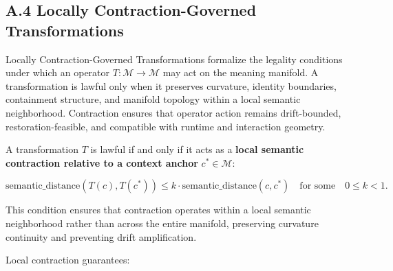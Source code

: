 
\subsection*{A.4 Locally Contraction-Governed Transformations}

\noindent Locally Contraction-Governed Transformations formalize the legality
conditions under which an operator $T : \mathcal{M} \rightarrow \mathcal{M}$
may act on the meaning manifold. A transformation is lawful only when it
preserves curvature, identity boundaries, containment structure, and manifold
topology within a local semantic neighborhood. Contraction ensures that operator
action remains drift-bounded, restoration-feasible, and compatible with runtime
and interaction geometry.

\medskip

\noindent A transformation $T$ is lawful if and only if it acts as a
\textbf{local semantic contraction relative to a context anchor} $c^* \in
\mathcal{M}$:



\[
\text{semantic\_distance}(T(c), T(c^*)) \le
k \cdot \text{semantic\_distance}(c, c^*)
\quad \text{for some} \quad 0 \le k < 1.
\]



\noindent This condition ensures that contraction operates within a local
semantic neighborhood rather than across the entire manifold, preserving
curvature continuity and preventing drift amplification.

\medskip

\noindent Local contraction guarantees:


